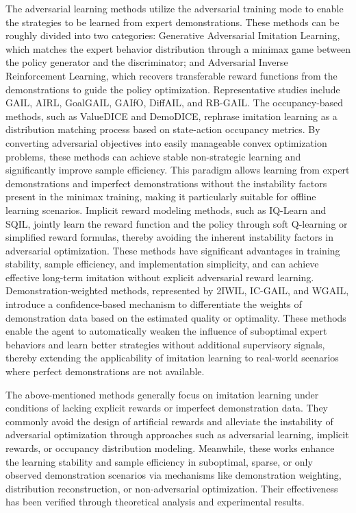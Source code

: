 \documentclass[lettersize,journal]{IEEEtran}
\begin{document}
The adversarial learning methods utilize the adversarial training mode to enable the strategies to be learned from expert demonstrations. These methods can be roughly divided into two categories: Generative Adversarial Imitation Learning, which matches the expert behavior distribution through a minimax game between the policy generator and the discriminator; and Adversarial Inverse Reinforcement Learning, which recovers transferable reward functions from the demonstrations to guide the policy optimization. Representative studies include GAIL, AIRL, GoalGAIL, GAIfO, DiffAIL, and RB-GAIL.
The occupancy-based methods, such as ValueDICE and DemoDICE, rephrase imitation learning as a distribution matching process based on state-action occupancy metrics. By converting adversarial objectives into easily manageable convex optimization problems, these methods can achieve stable non-strategic learning and significantly improve sample efficiency. This paradigm allows learning from expert demonstrations and imperfect demonstrations without the instability factors present in the minimax training, making it particularly suitable for offline learning scenarios.
Implicit reward modeling methods, such as IQ-Learn and SQIL, jointly learn the reward function and the policy through soft Q-learning or simplified reward formulas, thereby avoiding the inherent instability factors in adversarial optimization. These methods have significant advantages in training stability, sample efficiency, and implementation simplicity, and can achieve effective long-term imitation without explicit adversarial reward learning.
Demonstration-weighted methods, represented by 2IWIL, IC-GAIL, and WGAIL, introduce a confidence-based mechanism to differentiate the weights of demonstration data based on the estimated quality or optimality. These methods enable the agent to automatically weaken the influence of suboptimal expert behaviors and learn better strategies without additional supervisory signals, thereby extending the applicability of imitation learning to real-world scenarios where perfect demonstrations are not available.

The above-mentioned methods generally focus on imitation learning under conditions of lacking explicit rewards or imperfect demonstration data. They commonly avoid the design of artificial rewards and alleviate the instability of adversarial optimization through approaches such as adversarial learning, implicit rewards, or occupancy distribution modeling. Meanwhile, these works enhance the learning stability and sample efficiency in suboptimal, sparse, or only observed demonstration scenarios via mechanisms like demonstration weighting, distribution reconstruction, or non-adversarial optimization. Their effectiveness has been verified through theoretical analysis and experimental results.
\end{document}
